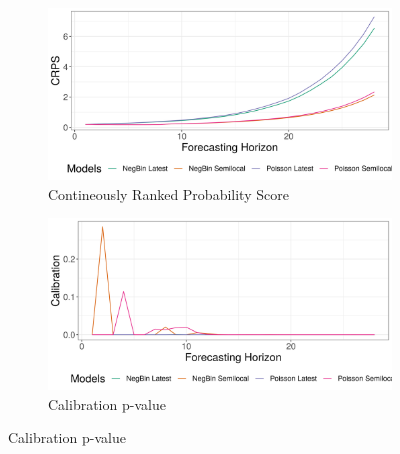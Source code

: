 \begin{figure}[H]
\begin{subfigure}{0.5\textwidth}
  \centering
  \includegraphics[width=\linewidth]{../output/Musienene_crps.png}  
  \caption{Contineously Ranked Probability Score}
  \label{fig:sub-first}
\end{subfigure}
\begin{subfigure}{0.5\textwidth}
  \centering
  \includegraphics[width=\linewidth]{../output/Musienene_calibration.png}  
  \caption{Calibration p-value}
  \label{fig:sub-second}
\end{subfigure}


\end{figure}
